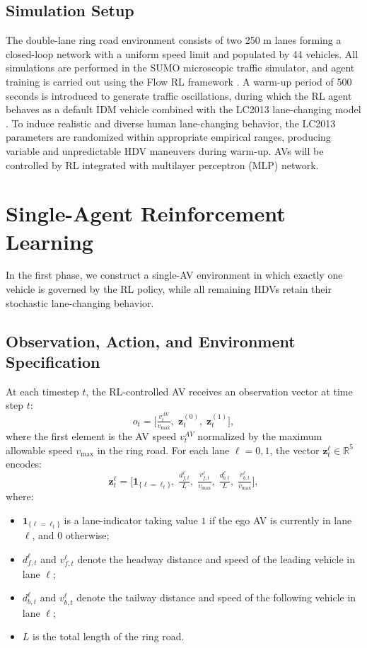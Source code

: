 \documentclass{ifacconf}
\newcommand{\1}{\mbox{1}\hspace{-0.25em}\mbox{l}}
\begin{document}
\subsection{Simulation Setup}
The double-lane ring road environment consists of two 250 m lanes forming a closed-loop network with a uniform speed limit and populated by 44 vehicles. All simulations are performed in the SUMO microscopic traffic simulator, and agent training is carried out using the Flow RL framework \citep{wu2017flow}. A warm-up period of 500 seconds is introduced to generate traffic oscillations, during which the RL agent behaves as a default IDM vehicle \citep{treiber2000congested} combined with the LC2013 lane-changing model \citep{erdmann2015sumo}. To induce realistic and diverse human lane-changing behavior, the LC2013 parameters are randomized within appropriate empirical ranges, producing variable and unpredictable HDV maneuvers during warm-up.
 AVs will be controlled by RL integrated with multilayer perceptron (MLP) network.
 
\section{Single-Agent Reinforcement Learning}\label{sec:Single}
In the first phase, we construct a single-AV environment in which exactly one vehicle is governed by the RL policy, while all remaining HDVs retain their stochastic lane-changing behavior.
\subsection{Observation, Action, and Environment Specification}
At each timestep $t$, the RL-controlled AV receives an observation vector at time step $t$:
\begin{equation}
o_t
=
\Big[
\tfrac{v_t^{AV}}{v_{\max}},
\;
\mathbf{z}_{t}^{(0)},
\;
\mathbf{z}_{t}^{(1)}
\Big],
\end{equation}
where the first element is the AV speed $v_t^{AV}$ normalized by the maximum allowable speed $v_{\max}$ in the ring road.
For each lane $\ell={0,1}$, the vector $\mathbf{z}_{t}^{\ell} \in \mathbb{R}^5$ encodes:
\begin{equation}
\mathbf{z}_{t}^{\ell}
=
\Big[
\mathbf{1}_{\{\ell = \ell_t\}},
\;
\tfrac{d_{f,t}^{\ell}}{L},
\;
\tfrac{v_{f,t}^{\ell}}{v_{\max}},
\;
\tfrac{d_{b,t}^{\ell}}{L},
\;
\tfrac{v_{b,t}^{\ell}}{v_{\max}}
\Big],
\end{equation}
where:
\begin{itemize}
\item $\mathbf{1}_{\{\ell = \ell_t\}}$ is a lane-indicator taking value $1$ if the ego AV is currently in lane $\ell$, and $0$ otherwise;
\item $d_{f,t}^{\ell}$ and $v_{f,t}^{\ell}$ denote the headway distance and speed of the leading vehicle in lane $\ell$;
\item $d_{b,t}^{\ell}$ and $v_{b,t}^{\ell}$ denote the tailway distance and speed of the following vehicle in lane $\ell$;
\item $L$ is the total length of the ring road.
\end{itemize}
\end{document}
